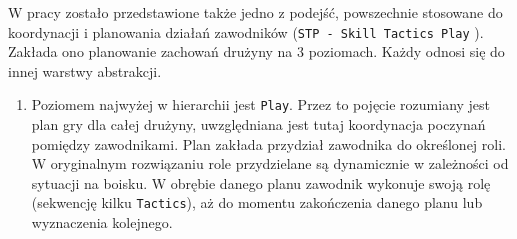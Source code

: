 W pracy zostało przedstawione także jedno z podejść, powszechnie stosowane do koordynacji i planowania działań zawodników (\mbox{\texttt{STP - Skill Tactics Play}} \cite{stp}).
Zakłada ono planowanie zachowań drużyny na $3$ poziomach. Każdy odnosi się do innej warstwy abstrakcji.
\begin{enumerate} 
  \item Poziomem najwyżej w hierarchii jest \texttt{Play}. Przez to pojęcie rozumiany jest plan gry dla całej drużyny, uwzględniana jest tutaj koordynacja
  poczynań pomiędzy zawodnikami. Plan zakłada przydział zawodnika do określonej roli. W oryginalnym rozwiązaniu role przydzielane są dynamicznie w zależności od sytuacji na boisku.
  W obrębie danego planu zawodnik wykonuje swoją rolę (sekwencję kilku \texttt{Tactics}), aż do momentu zakończenia danego planu lub wyznaczenia kolejnego.
  

\end{enumerate}
